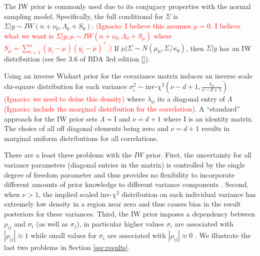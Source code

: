 \documentclass[a4paper]{article}
\newcommand{\nacho}[1]{\textcolor{red}{(Ignacio: #1)}}
\newcommand{\I}{\mathrm{I}}
\begin{document}
The IW prior is commonly used due to its conjugacy properties with the normal sampling model. Specifically, the full conditional for $\Sigma$ is 
$\Sigma \vert y \sim IW(n+\nu_0, \Lambda_0+S_0)$. \nacho{I believe this assumes $\mu=0$. I believe what we want is $\Sigma \vert y,\mu \sim IW(n+\nu_0, \Lambda_0+S_\mu)$ where $S_\mu = \sum_{i=1}^n (y_i-\mu) (y_i-\mu) ^\top$.} If $\mu|\Sigma \sim N(\mu_0,\Sigma/\kappa_0)$, then $\Sigma|y$ has an IW distribution (see Sec 3.6 of BDA 3rd edition \ref{}). 


Using an inverse Wishart prior for the covariance matrix induces an inverse scale chi-square distribution for each variance $\sigma_i^2\sim \mbox{inv-}\chi^2(\nu - d + 1, \frac{\lambda_{ii}}{\nu-d+1} )$ \nacho{we need to deine this density} where $\lambda_{ii}$ its a diagonal entry of $\Lambda$ \nacho{include the marginal distribution for the correlation}.  A ``standard'' approach for the IW prior sets $\Lambda=\I$ and $\nu=d+1$ where $\I$ is an identity matrix. The choice of all off diagonal elements being zero and $\nu=d+1$ results in marginal uniform distributions for all correlations.

There are a least three problems with the $IW$ prior. First, the uncertainty for all variance parameters (diagonal entries in the matrix) is controlled by the single degree of freedom parameter and thus provides no flexibility to incorporate different amounts of prior knowledge to different variance components \citep{bda2003}. Second, when $\nu>1$, the implied scaled inv-$\chi^2$ distribution on each individual variance has extremely low density in a region near zero and thus causes bias in the result posteriors for these variances. Third, the IW prior imposes a dependency between $\rho_{ij}$ and $\sigma_i$ (as well as $\sigma_j$), in particular higher values $\sigma_i$ are associated with $|\rho_{ij}|\approx 1$ while small values for $\sigma_i$ are associated with $|\rho_{ij}|\approx 0$ \citep{visualize}.  We illustrate the last two problems in Section \ref{sec:results}.

\end{document}
